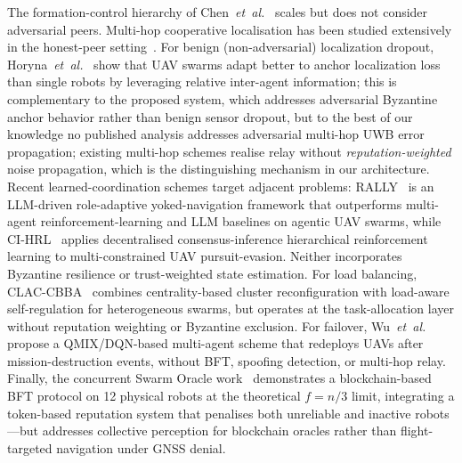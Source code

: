 \documentclass[journal,10pt,twocolumn]{IEEEtran}
\begin{document}
The formation-control hierarchy of Chen~\emph{et~al.}~\cite{wang2020groupbased} scales but does not consider adversarial peers. Multi-hop cooperative localisation has been studied extensively in the honest-peer setting~\cite{guo2017cooperative,wan2014dnbp}. For benign (non-adversarial) localization dropout, Horyna~\emph{et~al.}~\cite{horyna2025swa} show that UAV swarms adapt better to anchor localization loss than single robots by leveraging relative inter-agent information; this is complementary to the proposed system, which addresses adversarial Byzantine anchor behavior rather than benign sensor dropout, but to the best of our knowledge no published analysis addresses adversarial multi-hop UWB error propagation; existing multi-hop schemes realise relay without \emph{reputation-weighted} noise propagation, which is the distinguishing mechanism in our architecture. Recent learned-coordination schemes target adjacent problems: RALLY~\cite{wang2025rally} is an LLM-driven role-adaptive yoked-navigation framework that outperforms multi-agent reinforcement-learning and LLM baselines on agentic UAV swarms, while CI-HRL~\cite{xiang2025cihrl} applies decentralised consensus-inference hierarchical reinforcement learning to multi-constrained UAV pursuit-evasion. Neither incorporates Byzantine resilience or trust-weighted state estimation. For load balancing, CLAC-CBBA~\cite{gan2026clac} combines centrality-based cluster reconfiguration with load-aware self-regulation for heterogeneous swarms, but operates at the task-allocation layer without reputation weighting or Byzantine exclusion. For failover, Wu~\emph{et~al.}~\cite{wu2023redeployment} propose a QMIX/DQN-based multi-agent scheme that redeploys UAVs after mission-destruction events, without BFT, spoofing detection, or multi-hop relay. Finally, the concurrent Swarm Oracle work~\cite{pacheco2025swarmoracle} demonstrates a blockchain-based BFT protocol on 12 physical robots at the theoretical $f{=}n/3$ limit, integrating a token-based reputation system that penalises both unreliable and inactive robots---but addresses collective perception for blockchain oracles rather than flight-targeted navigation under GNSS denial.
\end{document}
